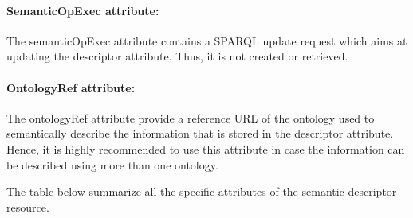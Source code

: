 \paragraph*{SemanticOpExec attribute:}
The semanticOpExec attribute contains a SPARQL update request which aims at updating the descriptor attribute. Thus, it is not created or retrieved. 
\paragraph*{OntologyRef attribute:}
 The ontologyRef attribute provide a reference URL of the ontology used to semantically describe the information that is stored in the descriptor attribute. Hence, it is highly recommended to use this attribute in case the information can be described using more than one ontology.\par
The table below summarize all the specific attributes of the semantic descriptor resource.


